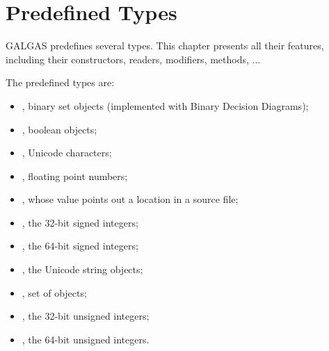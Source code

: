 
\chapter{Predefined Types} \label{predefinedTypes}

GALGAS predefines several types. This chapter presents all their features, including their constructors, readers, modifiers, methods, ...


\begin{description}
\item The predefined types are:
\begin{itemize}
\item {}, binary set objects (implemented with Binary Decision Diagrams);
\item {}, boolean objects;
\item {}, Unicode characters;
\item {}, floating point numbers;
\item {}, whose value points out a location in a source file;
\item {}, the 32-bit signed integers;
\item {}, the 64-bit signed integers;
\item {}, the Unicode string objects;
\item {}, set of  objects;
\item {}, the 32-bit unsigned integers;
\item {}, the 64-bit unsigned integers.
\end{itemize}
\end{description}













